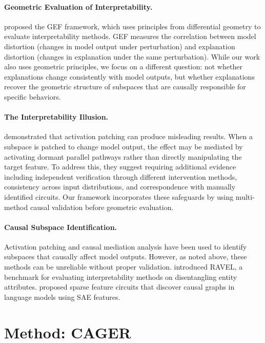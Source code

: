 \documentclass{article}
\begin{document}
\paragraph{Geometric Evaluation of Interpretability.} \citet{hedstroem2025evaluating} proposed the GEF framework, which uses principles from differential geometry to evaluate interpretability methods. GEF measures the correlation between model distortion (changes in model output under perturbation) and explanation distortion (changes in explanation under the same perturbation). While our work also uses geometric principles, we focus on a different question: not whether explanations change consistently with model outputs, but whether explanations recover the geometric structure of subspaces that are causally responsible for specific behaviors.

\paragraph{The Interpretability Illusion.} \citet{makelov2024subspace} demonstrated that activation patching can produce misleading results. When a subspace is patched to change model output, the effect may be mediated by activating dormant parallel pathways rather than directly manipulating the target feature. To address this, they suggest requiring additional evidence including independent verification through different intervention methods, consistency across input distributions, and correspondence with manually identified circuits. Our framework incorporates these safeguards by using multi-method causal validation before geometric evaluation.

\paragraph{Causal Subspace Identification.} Activation patching \citep{nanda2022attribution,heimersheim2024activation} and causal mediation analysis \citep{vig2020investigating} have been used to identify subspaces that causally affect model outputs. However, as noted above, these methods can be unreliable without proper validation. \citet{huang2024ravel} introduced RAVEL, a benchmark for evaluating interpretability methods on disentangling entity attributes. \citet{marks2024sparse} proposed sparse feature circuits that discover causal graphs in language models using SAE features.

\section{Method: CAGER}
\end{document}
